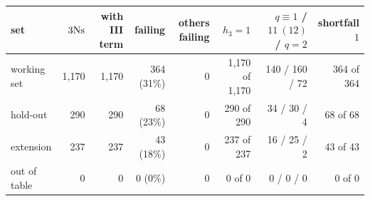 \begin{tabular}{lrrrrrrr}
\toprule
set & $3\mathrm{Ns}$ & with III term & failing & others failing & $h_3=1$ & $q\equiv1$ / $11\ (12)$ / $q=2$ & shortfall $1$\\
\midrule
working set & 1,170 & 1,170 & 364 (31\%) & 0 & 1,170 of 1,170 & 140 / 160 / 72 & 364 of 364\\
hold-out & 290 & 290 & 68 (23\%) & 0 & 290 of 290 & 34 / 30 / 4 & 68 of 68\\
extension & 237 & 237 & 43 (18\%) & 0 & 237 of 237 & 16 / 25 / 2 & 43 of 43\\
out of table & 0 & 0 & 0 (0\%) & 0 & 0 of 0 & 0 / 0 / 0 & 0 of 0\\
\bottomrule
\end{tabular}
